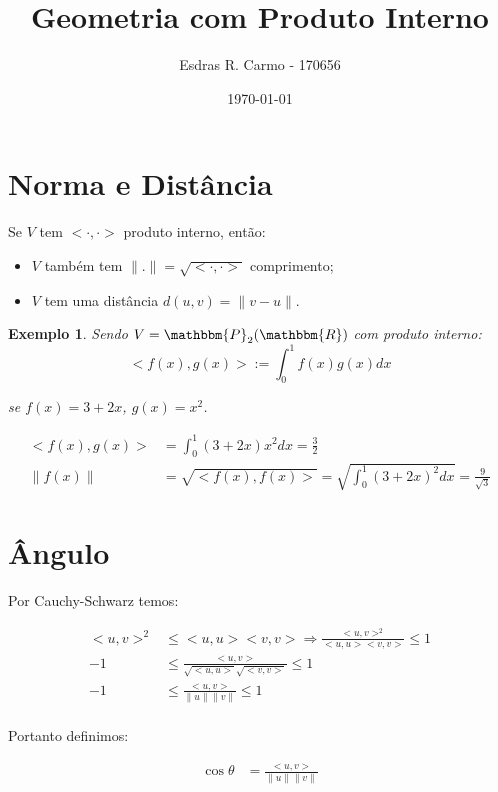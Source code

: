 \documentclass{article}
\author{Esdras R. Carmo - 170656}
\title{Geometria com Produto Interno}
\date{\today}
\newcommand{\REAL} {\mathbbm{R}}
\newcommand{\POL}[1] {\mathbbm{P}_{#1} (\REAL)}
\newcommand{\norm}[1] {\left.\parallel #1 \right.\parallel}
\newcommand{\interno}[0] {<\cdot, \cdot>}
\newtheorem{example}{Exemplo}[section]
\begin{document}
    \maketitle

    \section{Norma e Distância}
        Se $V$ tem $\interno$ produto interno, então:

        \begin{itemize}
            \item $V$ também tem $\norm{.} = \sqrt{\interno}$ comprimento;
            \item $V$ tem uma distância $d(u,v) = \norm{v - u}$.
        \end{itemize}

        \begin{example}
            Sendo $V = \POL{2}$ com produto interno:
            \[
                <f(x), g(x)> := \int_0^1 f(x) g(x) dx
            \]

            se $f(x) = 3 + 2x$, $g(x) = x^2$.

            \begin{align*}
                <f(x), g(x)> &= \int_0^1 (3 + 2x)x^2 dx = \frac{3}{2}\\
                \norm{f(x)} &= \sqrt{<f(x), f(x)>} = \sqrt{\int_0^1 (3 + 2x)^2 dx} = \frac{9}{\sqrt{3}}
            \end{align*}
        \end{example}

    \section{Ângulo}
        Por Cauchy-Schwarz temos:

        \begin{align*}
            <u,v>^2 &\leq <u,u> <v,v> \Rightarrow \frac{<u,v>^2}{<u,u> <v,v>} \leq 1\\
            -1 &\leq \frac{<u,v>}{\sqrt{<u,u>} \sqrt{<v,v>}} \leq 1\\
            -1 &\leq \frac{<u,v>}{\norm{u} \norm{v}} \leq 1\\
        \end{align*}

        Portanto definimos:

        \begin{align*}
            \cos \theta &= \frac{<u,v>}{\norm{u} \norm{v}}
        \end{align*}
\end{document}
